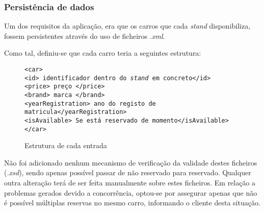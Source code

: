 \documentclass[a4paper]{article}
\begin{document}
\subsubsection{Persistência de dados}

Um dos requisitos da aplicação, era que os carros que cada \emph{stand} disponibiliza, fossem persistentes através do uso de ficheiros \emph{.xml}. 

Como tal, definiu-se que cada carro teria a seguintes estrutura:

\begin{figure}[H]
	\begin{framed}
		\texttt{<car> \\
					\hspace*{5mm}<id> identificador dentro do \emph{stand} em concreto</id> \\
					\hspace*{5mm}<price> preço </price>\\
					\hspace*{5mm}<brand> marca </brand>\\
					\hspace*{5mm}<yearRegistration> ano do registo de matricula</yearRegistration>\\
					\hspace*{5mm}<isAvailable> Se está reservado de momento</isAvailable>\\
			    </car>
		}		
	\end{framed}
	\caption{Estrutura de cada entrada}
  \label{fig:httpHeaderReq}
\end{figure}

Não foi adicionado nenhum mecanismo de verificação da validade destes ficheiros (\emph{.xsd}), sendo apenas possível passar de não reservado para reservado. Qualquer outra alteração terá de ser feita manualmente sobre estes ficheiros.
Em relação a problemas gerados devido a concorrência, optou-se por assegurar apenas que não é possível múltiplas reservas no mesmo carro, informando o cliente desta situação.
\end{document}

